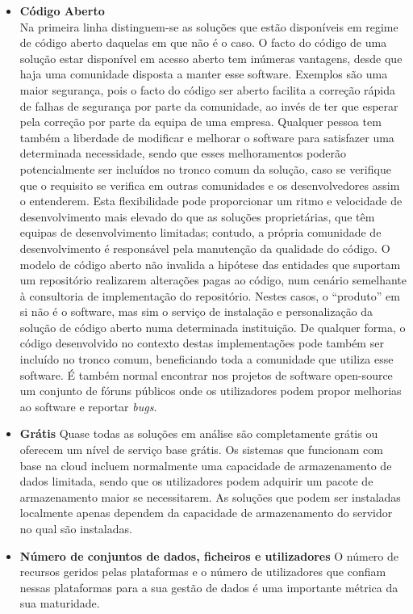 \documentclass[sigconf,nonacm]{acmart}
\begin{document}
\begin{itemize}
	\item \textbf{Código Aberto}\\
	Na primeira linha distinguem-se as soluções que estão disponíveis em regime de código aberto daquelas em que não é o caso. O facto do código de uma solução estar disponível em acesso aberto tem inúmeras vantagens, desde que haja uma comunidade disposta a manter esse software. Exemplos são uma maior segurança, pois o facto do código ser aberto facilita a correção rápida de falhas de segurança por parte da comunidade, ao invés de ter que esperar pela correção por parte da equipa de uma empresa. Qualquer pessoa tem também a liberdade de modificar e melhorar o software para satisfazer uma determinada necessidade, sendo que esses melhoramentos poderão potencialmente ser incluídos no tronco comum da solução, caso se verifique que o requisito se verifica em outras comunidades e os desenvolvedores assim o entenderem. Esta flexibilidade pode proporcionar um ritmo e velocidade de desenvolvimento mais elevado do que as soluções proprietárias, que têm equipas de desenvolvimento limitadas; contudo, a própria comunidade de desenvolvimento é responsável pela manutenção da qualidade do código. O modelo de código aberto não invalida a hipótese das entidades que suportam um repositório realizarem alterações pagas ao código, num cenário semelhante à consultoria de implementação do repositório. Nestes casos, o ``produto'' em si não é o software, mas sim o serviço de instalação e personalização da solução de código aberto numa determinada instituição. De qualquer forma, o código desenvolvido no contexto destas implementações pode também ser incluído no tronco comum, beneficiando toda a comunidade que utiliza esse software. É também normal encontrar nos projetos de software open-source um conjunto de fóruns públicos onde os utilizadores podem propor melhorias ao software e reportar \textit{bugs}.
	\item \textbf{Grátis} 
	Quase todas as soluções em análise são completamente grátis ou oferecem um nível de serviço base grátis. Os sistemas que funcionam com base na cloud incluem normalmente uma capacidade de armazenamento de dados limitada, sendo que os utilizadores podem adquirir um pacote de armazenamento maior se necessitarem. As soluções que podem ser instaladas localmente apenas dependem da capacidade de armazenamento do servidor no qual são instaladas.
	\item \textbf{Número de conjuntos de dados, ficheiros e utilizadores}
	O número de recursos geridos pelas plataformas e o número de utilizadores que confiam nessas plataformas para a sua gestão de dados é uma importante métrica da sua maturidade. 

\end{itemize}
\end{document}
